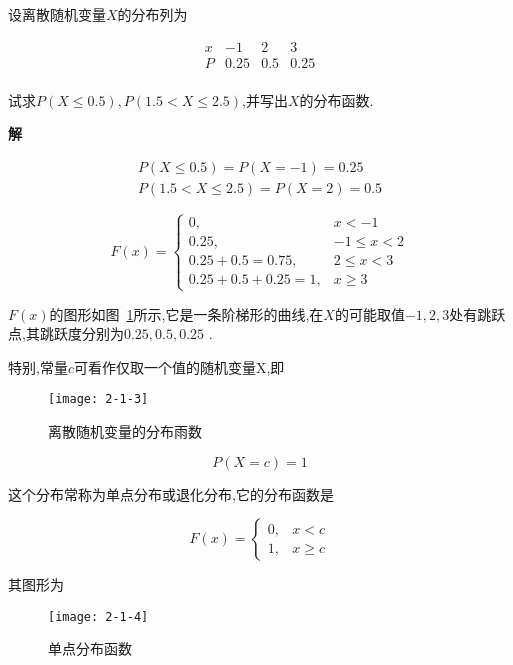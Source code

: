 \begin{example}
	设离散随机变量$ X $的分布列为
	
	\[ 
	\begin{array}{c|ccc}
	x & -1 & 2 & 3 \\\hline
	P & 0.25 & 0.5 & 0.25 \\
	\end{array}
	\]
	
	试求$P(X \leqslant 0.5), P(1.5<X \leqslant 2.5)$,并写出$ X $的分布函数.
	
	\textbf{解}
	
	\[ 
	\begin{array}{l}{P(X \leqslant 0.5)=P(X=-1)=0.25} \\ {P(1.5<X \leqslant 2.5)=P(X=2)=0.5}\end{array}
	\]
	
	\[ 
	F(x)=\left\{\begin{array}{ll}
	{0,} & {x<-1} \\ 
	{0.25,} & {-1 \leqslant x<2} \\ 
	{0.25+0.5=0.75,} & {2 \leqslant x<3} \\ 
	{0.25+0.5+0.25=1,} & {x \geqslant 3}
	\end{array}\right.\]
	
	$ F(x) $的图形如图~\ref{fig:2-1-3}所示,它是一条阶梯形的曲线,在$ X $的可能取值$-1,2,3$处有跳跃点,其跳跃度分别为$ 0.25,0.5,0.25 $ .
	
	
	特别,常量$ c $可看作仅取一个值的随机变量X,即
	
	\begin{figure}
		\centering
		\texttt{[image: 2-1-3]}
		\caption{离散随机变量的分布雨数}
		\label{fig:2-1-3}
	\end{figure}
	
	\[ 
	P(X=c)=1
	\]
	
	这个分布常称为单点分布或退化分布,它的分布函数是
	
	\begin{equation}
	F(x)=\left\{\begin{array}{ll}
	{0,} & {x<c} \\ 
	{1,} & {x \geqslant c}
	\end{array}\right.  \label{eq:2.1.3}
	\end{equation}
	
	其图形为
	\begin{figure}
		\centering
		\texttt{[image: 2-1-4]}
		\caption{单点分布函数}
		\label{fig:2-1-4}
	\end{figure}
	
	
\end{example}

